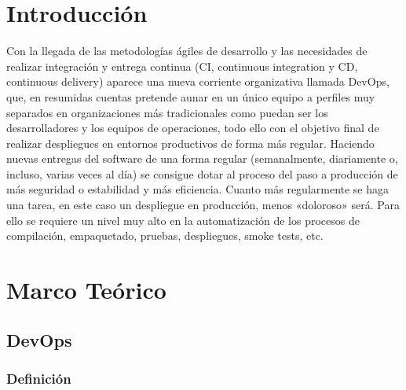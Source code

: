 \documentclass[preprint,12pt]{elsarticle}
\begin{document}



\section{Introducción}  %

Con la llegada de las metodologías ágiles de desarrollo y las necesidades de realizar integración y entrega continua (CI, continuous integration y CD,
continuous delivery) aparece una nueva corriente organizativa llamada DevOps, que, en resumidas cuentas pretende aunar en un único equipo a
perfiles muy separados en organizaciones más tradicionales como puedan ser los desarrolladores y los equipos de operaciones, todo ello con el objetivo final
de realizar despliegues en entornos productivos de forma más regular. Haciendo nuevas entregas del software de una forma regular (semanalmente, diariamente o, incluso, varias veces al día) se consigue dotar al proceso del paso a producción de más seguridad o estabilidad y más eficiencia. Cuanto
más regularmente se haga una tarea, en este caso un despliegue en producción, menos «doloroso» será. Para ello se requiere un nivel muy alto en
la automatización de los procesos de compilación, empaquetado, pruebas, despliegues, smoke tests, etc.




\section{Marco Teórico}


\subsection {\textbf{DevOps}}

\subsubsection{\textbf{Definición}}
\end{document}

